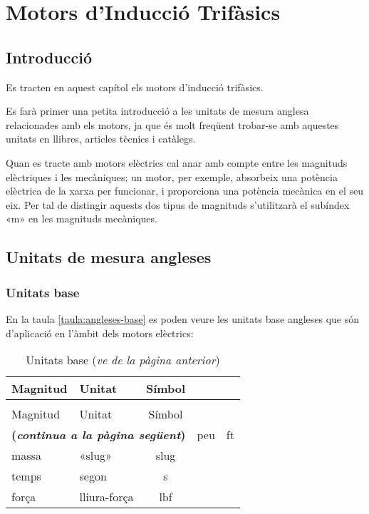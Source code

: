 \chapter{Motors d'Inducció Trifàsics}\label{sec:motors-ind}

\section{Introducció}

Es tracten en aquest capítol els motors d'inducció trifàsics.

Es farà primer una petita introducció a les unitats de mesura anglesa relacionades amb els motors, ja que és molt freqüent trobar-se amb aquestes unitats en llibres, articles tècnics i catàlegs.

Quan es tracte amb motors elèctrics cal anar amb compte entre les magnituds elèctriques i les mecàniques; un motor, per exemple, absorbeix una potència elèctrica de la xarxa per funcionar, i proporciona una potència mecànica en el seu eix. Per tal de distingir aquests dos tipus de magnituds s'utilitzarà el subíndex «m» en les magnituds mecàniques.

\section{Unitats de mesura angleses}

\subsection{Unitats base}

En la taula \vref{taula:angleses-base} es poden veure les unitats base angleses que són d'aplicació en l'àmbit dels motors elèctrics:
\begin{longtable}[h]{llc}
   \caption{\label{taula:angleses-base}Unitats base}\\
   \toprule[1pt]
    Magnitud & Unitat & Símbol \\
   \midrule
   \endfirsthead
   \caption[]{Unitats base (\emph{ve de la pàgina anterior})}\\
   \toprule[1pt]
    Magnitud & Unitat & Símbol \\
   \midrule
   \endhead
   \midrule
   \multicolumn{3}{r}{\sffamily\bfseries\color{NavyBlue}(\emph{continua a la pàgina següent})}
   \endfoot
   \endlastfoot
   longitud & peu & ft \\
   massa & «slug» & slug \\
   temps & segon & s\\
   força & lliura-força & lbf \\
   \bottomrule[1pt]
\end{longtable}

